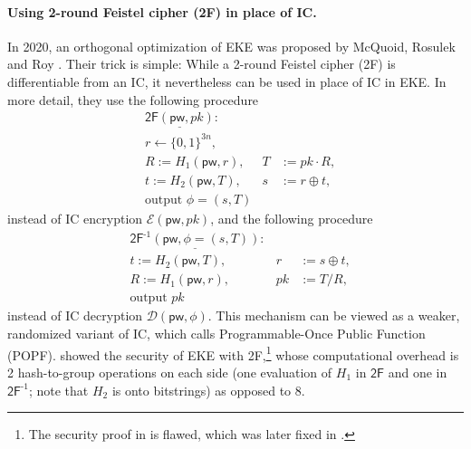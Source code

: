\documentclass{article}
\theoremstyle{plain}
\theoremstyle{definition}
\theoremstyle{remark}
\newcommand{\pw}{\mathsf{pw}}
\begin{document}
\paragraph{Using 2-round Feistel cipher (2F) in place of IC.}
In 2020, an orthogonal optimization of EKE was proposed by McQuoid, Rosulek and Roy \cite{CCS:McQRosRoy20}. Their trick is simple: While a 2-round Feistel cipher (2F) is differentiable from an IC, it nevertheless can be used in place of IC in EKE. In more detail, they use the following procedure
\begin{align*}
& \underline{\mathsf{2F}(\pw,pk)}: \\
& r \gets \{0,1\}^{3n}, \\
& R := H_1(\pw,r), &T &:= pk \cdot R, \\
& t := H_2(\pw,T), &s &:= r \oplus t, \\
& \text{output }\phi = (s,T)
\end{align*}
instead of IC encryption $\mathcal{E}(\pw,pk)$, and the following procedure
\begin{align*}
& \underline{\mathsf{2F}^{\text{-}1}(\pw,\phi = (s,T))}: \\
& t := H_2(\pw,T), &r &:= s \oplus t, \\
& R := H_1(\pw,r), &pk &:= T/R, \\
& \text{output }pk
\end{align*}
instead of IC decryption $\mathcal{D}(\pw,\phi)$. This mechanism can be viewed as a weaker, randomized variant of IC, which \cite{CCS:McQRosRoy20} calls Programmable-Once Public Function (POPF). \cite{CCS:McQRosRoy20} showed the security of EKE with 2F,\footnote{The security proof in \cite{CCS:McQRosRoy20} is flawed, which was later fixed in \cite{EC:JanRoyXu25}.} whose computational overhead is 2 hash-to-group operations on each side (one evaluation of $H_1$ in $\mathsf{2F}$ and one in $\mathsf{2F}^{\text{-}1}$; note that $H_2$ is onto bitstrings) as opposed to 8.
\end{document}
